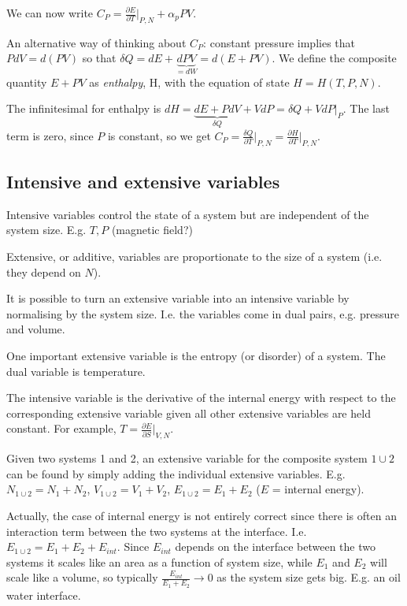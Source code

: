 \documentclass{article}
\begin{document}
We can now write $C_P = \frac{\partial E}{\partial T}\vert_{P,N} + \alpha_pPV$.

An alternative way of thinking about $C_P$: constant pressure implies that $PdV = d(PV)$ so that $\delta Q = dE + \underbrace{dPV}_{=dW} = d(E+PV)$. We define the composite quantity $E+PV$ as \emph{enthalpy}, H, with the equation of state $H = H(T,P,N)$.

The infinitesimal for enthalpy is $dH = \underbrace{dE +PdV}_{\delta Q}+ VdP = \delta Q + VdP\vert_{P}$. The last term is zero, since $P$ is constant, so we get $C_P = \frac{\delta Q}{\partial T}\vert_{P,N} = \frac{\partial H}{\partial T}\vert_{P,N} $.

\subsection*{Intensive and extensive variables}

Intensive variables control the state of a system but are independent of the system size. E.g. $T,P$ (magnetic field?)

Extensive, or additive, variables are proportionate to the size of a system (i.e. they depend on $N$).

It is possible to turn an extensive variable into an intensive variable by normalising by the system size. I.e. the variables come in dual pairs, e.g. pressure and volume.

One important extensive variable is the entropy (or disorder) of a system. The dual variable is temperature.

The intensive variable is the derivative of the internal energy with respect to the corresponding extensive variable given all other extensive variables are held constant. For example, $T = \frac{\partial E}{\partial S}\vert_{V,N}$.

Given two systems 1 and 2, an extensive variable for the composite system $1\cup2$ can be found by simply adding the individual extensive variables. E.g. $N_{1\cup2} = N_1 + N_2$, $V_{1\cup2} = V_1 + V_2$, $E_{1\cup2} = E_1 + E_2$ ($E$ = internal energy).

Actually, the case of internal energy is not entirely correct since there is often an interaction term between the two systems at the interface. I.e. $E_{1\cup2} = E_1+E_2+E_{int}$. Since $E_{int}$ depends on the interface between the two systems it scales like an area as a function of system size, while $E_1$ and $E_2$ will scale like a volume, so typically $\frac{E_{int}}{E_1+E_2}\rightarrow0$ as the system size gets big. E.g. an oil water interface.
\end{document}

